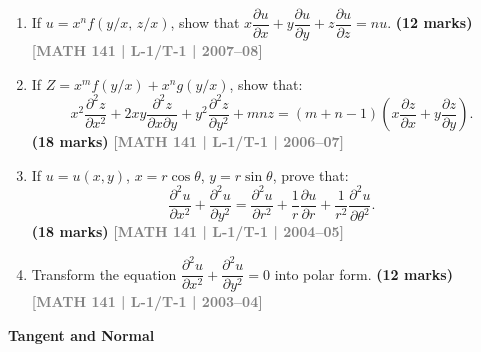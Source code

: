 \documentclass[12pt,a3paper]{article}
\newcommand{\yr}[1]{\hfill\textcolor{gray}{\small\textbf{[#1]}}}
\newcommand{\mk}[1]{\textcolor{orange!70!black}{\small\textbf{(#1 marks)}}}
\newcommand{\subtopic}[2]{%
  \vspace{10pt}
  \noindent\begin{tcolorbox}[colback=#1!8,colframe=#1,boxrule=0.6pt,arc=4pt,
    left=6pt,right=6pt,top=4pt,bottom=4pt]
    \small\bfseries\textcolor{#1}{#2}
  \end{tcolorbox}
  \vspace{2pt}
}
\begin{document}
\begin{enumerate}
\item If $u=x^{n}f(y/x,\,z/x)$, show that $x\dfrac{\partial u}{\partial x}+y\dfrac{\partial u}{\partial y}+z\dfrac{\partial u}{\partial z}=nu$.
\mk{12} \yr{MATH 141 | L-1/T-1 | 2007--08}

\item If $Z=x^{m}f(y/x)+x^{n}g(y/x)$, show that:
\[
x^{2}\frac{\partial^{2}z}{\partial x^{2}}+2xy\frac{\partial^{2}z}{\partial x\partial y}+y^{2}\frac{\partial^{2}z}{\partial y^{2}}+mnz=(m+n-1)\!\left(x\frac{\partial z}{\partial x}+y\frac{\partial z}{\partial y}\right).
\]
\mk{18} \yr{MATH 141 | L-1/T-1 | 2006--07}

\item If $u=u(x,y)$, $x=r\cos\theta$, $y=r\sin\theta$, prove that:
\[
\frac{\partial^{2}u}{\partial x^{2}}+\frac{\partial^{2}u}{\partial y^{2}}=\frac{\partial^{2}u}{\partial r^{2}}+\frac{1}{r}\frac{\partial u}{\partial r}+\frac{1}{r^{2}}\frac{\partial^{2}u}{\partial\theta^{2}}.
\]
\mk{18} \yr{MATH 141 | L-1/T-1 | 2004--05}

\item Transform the equation $\dfrac{\partial^{2}u}{\partial x^{2}}+\dfrac{\partial^{2}u}{\partial y^{2}}=0$ into polar form.
\mk{12} \yr{MATH 141 | L-1/T-1 | 2003--04}

\end{enumerate}

\subtopic{cA}{Tangent and Normal}
\label{sub:s1-tangnorm}
\end{document}
